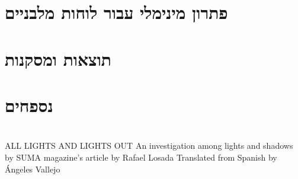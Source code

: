 \documentclass[12pt,twoside]{article}
\begin{document}
\section{פתרון מינימלי עבור לוחות מלבניים}

\section{תוצאות ומסקנות}

\section{נספחים}

\section{} %
\begin{thebibliography}{99}
\unsethebrew
{} ALL LIGHTS AND LIGHTS OUT
An investigation among lights and shadows by
SUMA magazine’s article by Rafael Losada
Translated from Spanish by Ángeles Vallejo
\sethebrew

\end{thebibliography}
\end{document}
